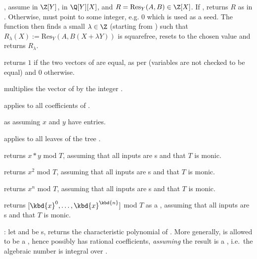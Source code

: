 ,
assume  in $\Z[Y]$,  in $\Q[Y][X]$, and $R =
\text{Res}_Y(A, B) \in \Z[X]$. If , returns $R$
as in . Otherwise,  must point to
some integer, e.g. $0$ which is used as a seed. The function then finds a
small $\lambda \in \Z$ (starting from ) such that
$R_\lambda(X) := \text{Res}_Y(A, B(X + \lambda Y))$ is squarefree, resets
 to the chosen value and returns $R_{\lambda}$.


 returns $1$ if the two vectors of 
are equal, as per  (variables are not checked to be equal) and
$0$ otherwise.

 multiplies the vector of  
by the integer .

 applies  to all
coefficients of .

 as  assuming $x$
and $y$ have  entries.


 applies  to all
leaves of the tree .


 returns $x*y$ mod $T$, assuming
that all inputs are s and that $T$ is monic.

 returns $x^2$ mod $T$, assuming
that all inputs are s and that $T$ is monic.

 returns $x^n$ mod $T$, assuming
that all inputs are s and that $T$ is monic.

 returns $[\kbd{x}^0,
\dots, \kbd{x}^\kbd{n}]$ mod $T$ as a , assuming that all inputs are
s and that $T$ is monic.

: let  and  be
s, returns the characteristic polynomial of .
More generally,  is allowed to be a , hence possibly has
rational coefficients, \emph{assuming} the result is a , i.e.~the
algebraic number  is integral over .

